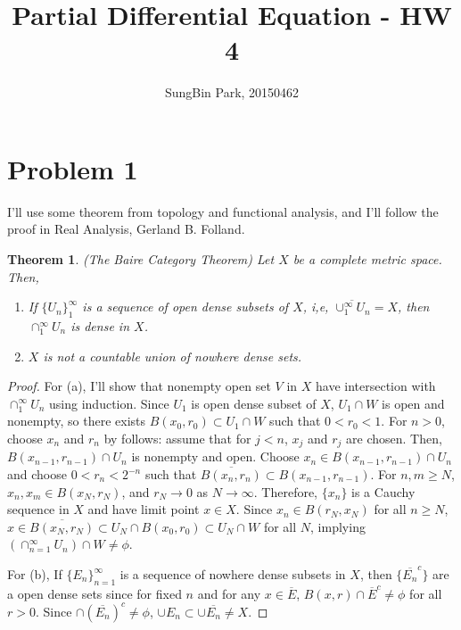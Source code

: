\documentclass{article}
\newtheorem{theorem}{Theorem}
\begin{document}
\title{Partial Differential Equation - HW 4}
\author{SungBin Park, 20150462} 

 \maketitle

\section*{Problem 1}
I'll use some theorem from topology and functional analysis, and I'll follow the proof in Real Analysis, Gerland B. Folland.
\begin{theorem}
(The Baire Category Theorem) Let $X$ be a complete metric space. Then,
\begin{enumerate}
\item[(a)] If $\{U_n\}_1^\infty$ is a sequence of open dense subsets of $X$, i,e, $\overline{\cup_1^\infty U_n}=X$, then $\cap_1^\infty U_n$ is dense in $X$.
\item[(b)] $X$ is not a countable union of nowhere dense sets.
\end{enumerate}
\end{theorem}
\begin{proof}
For (a), I'll show that nonempty open set $V$ in $X$ have intersection with $\cap_1^\infty U_n$ using induction. Since $U_1$ is open dense subset of $X$, $U_1\cap W$ is open and nonempty, so there exists $B(x_0, r_0)\subset U_1\cap W$ such that $0<r_0<1$. For $n>0$, choose $x_n$ and $r_n$ by follows: assume that for $j<n$, $x_j$ and $r_j$ are chosen. Then, $B(x_{n-1},r_{n-1})\cap U_n$ is nonempty and open. Choose $x_n\in B(x_{n-1},r_{n-1})\cap U_n$ and choose $0<r_n<2^{-n}$ such that $\overline{B(x_n,r_n)}\subset B(x_{n-1},r_{n-1})$. For $n,m\geq N$, $x_n,x_m\in B(x_N, r_N)$, and $r_N\rightarrow 0$ as $N\rightarrow \infty$. Therefore, $\{x_n\}$ is a Cauchy sequence in $X$ and have limit point $x\in X$. Since $x_n\in B(r_N, x_N)$ for all $n\geq N$, $x\in \overline{B(x_N, r_N)}\subset U_N\cap B(x_0, r_0)\subset U_N\cap W$ for all $N$, implying $\left(\cap_{n=1}^\infty U_n\right)\cap W\neq \phi$.

For (b), If $\{E_n\}_{n=1}^\infty$ is a sequence of nowhere dense subsets in $X$, then $\{\overline{E_n}^c\}$ are a open dense sets since for fixed $n$ and for any $x\in \overline{E}$, $B(x,r)\cap \overline{E}^c\neq \phi$ for all $r>0$. Since $\cap\left(\overline{E_n}\right)^c\neq \phi$, $\cup E_n\subset \cup \overline{E_n}\neq X$.
\end{proof}
\end{document}
